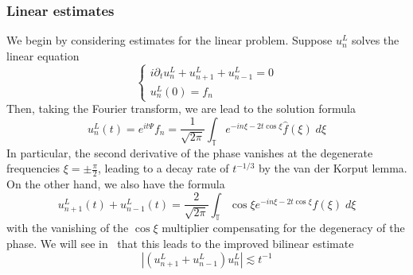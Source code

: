 \documentclass[letterpaper, reqno,final]{amsart}
\newcommand{\bbT}{\mathbb{T}}
\newcommand{\fhPi}{\frac{\pi}{2}}
\newcommand{\discrAvg}{\Psi}
\newcommand{\linProp}[1][t]{e^{i#1\discrAvg}}
\newcommand{\invLinProp}[1][t]{e^{-i#1\discrAvg}}
\begin{document}
\subsubsection{Linear estimates}
We begin by considering estimates for the linear problem.  Suppose $u_n^L$ solves the linear equation
\begin{equation*}
    \left\{\begin{array}{l}
        i \partial_t u_n^L + u_{n+1}^L + u_{n-1}^L = 0\\
        u_n^L(0) = f_n
    \end{array}\right.
\end{equation*}
Then, taking the Fourier transform, we are lead to the solution formula
\begin{equation*}
    u_n^L(t) = e^{it\Psi} f_n = \frac{1}{\sqrt{2\pi}} \int_{\bbT} e^{-in \xi -2t \cos \xi} \hat{f}(\xi)\;d\xi
\end{equation*}
In particular, the second derivative of the phase vanishes at the degenerate frequencies $\xi =\pm \fhPi$, leading to a decay rate of $t^{-1/3}$ by the van der Korput lemma.  On the other hand, we also have the formula
\begin{equation*}
    u_{n+1}^L(t) + u_{n-1}^L(t) = \frac{2}{\sqrt{2\pi}} \int_{\bbT} \cos \xi e^{-in \xi -2t \cos \xi} \hat{f}(\xi)\;d\xi
\end{equation*}
with the vanishing of the $\cos \xi$ multiplier compensating for the degeneracy of the phase.  We will see in~ that this leads to the improved bilinear estimate
\begin{equation*}
    |(u_{n+1}^L + u_{n-1}^L) u_n^L| \lesssim t^{-1}
\end{equation*}
\end{document}
